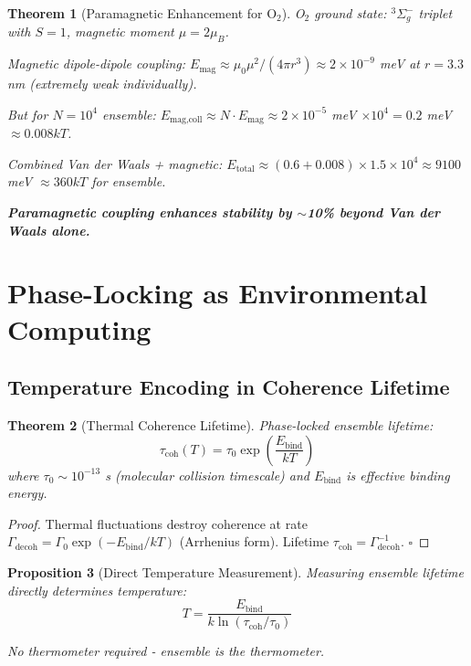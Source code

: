 \documentclass[11pt,a4paper]{article}
\newtheorem{theorem}{Theorem}[section]
\newtheorem{proposition}[theorem]{Proposition}
\theoremstyle{definition}
\theoremstyle{remark}
\begin{document}
\begin{theorem}[Paramagnetic Enhancement for O$_2$]
O$_2$ ground state: $^3\Sigma_g^-$ triplet with $S=1$, magnetic moment $\mu = 2\mu_B$.

Magnetic dipole-dipole coupling: $E_{\text{mag}} \approx \mu_0\mu^2/(4\pi r^3) \approx 2 \times 10^{-9}$ meV at $r = 3.3$ nm (extremely weak individually).

But for $N = 10^4$ ensemble: $E_{\text{mag,coll}} \approx N \cdot E_{\text{mag}} \approx 2 \times 10^{-5}$ meV $\times 10^4 = 0.2$ meV $\approx 0.008 kT$.

Combined Van der Waals + magnetic: $E_{\text{total}} \approx (0.6 + 0.008) \times 1.5 \times 10^4 \approx 9100$ meV $\approx 360 kT$ for ensemble.

\textbf{Paramagnetic coupling enhances stability by $\sim$10\% beyond Van der Waals alone.}
\end{theorem}

\section{Phase-Locking as Environmental Computing}

\subsection{Temperature Encoding in Coherence Lifetime}

\begin{theorem}[Thermal Coherence Lifetime]
Phase-locked ensemble lifetime:
\begin{equation}
\tau_{\text{coh}}(T) = \tau_0 \exp\left(\frac{E_{\text{bind}}}{kT}\right)
\end{equation}
where $\tau_0 \sim 10^{-13}$ s (molecular collision timescale) and $E_{\text{bind}}$ is effective binding energy.
\end{theorem}

\begin{proof}
Thermal fluctuations destroy coherence at rate $\Gamma_{\text{decoh}} = \Gamma_0 \exp(-E_{\text{bind}}/kT)$ (Arrhenius form). Lifetime $\tau_{\text{coh}} = \Gamma_{\text{decoh}}^{-1}$. $\square$
\end{proof}

\begin{proposition}[Direct Temperature Measurement]
Measuring ensemble lifetime directly determines temperature:
\begin{equation}
T = \frac{E_{\text{bind}}}{k \ln(\tau_{\text{coh}}/\tau_0)}
\end{equation}

No thermometer required - ensemble \textit{is} the thermometer.
\end{proposition}
\end{document}
